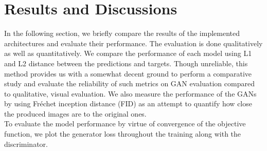 \documentclass[10pt,twocolumn,letterpaper]{article}
\begin{document}
\section{Results and Discussions}
    \hspace*{0.167 in}In the following section, we briefly compare the results of the implemented architectures and evaluate their performance. The evaluation is done qualitatively as well as quantitatively. We compare the performance of each model using L1 and L2 distance between the predictions and targets. Though unreliable, this method provides us with a somewhat decent ground to perform a comparative study and evaluate the reliability of such metrics on GAN evaluation compared to qualitative, visual evaluation. We also measure the performance of the GANs by using Fréchet inception distance (FID) as an attempt to quantify how close the produced images are to the original ones.\\
    \hspace*{0.167 in}To evaluate the model performance by virtue of convergence of the objective function, we plot the generator loss throughout the training along with the discriminator.\\
\end{document}
